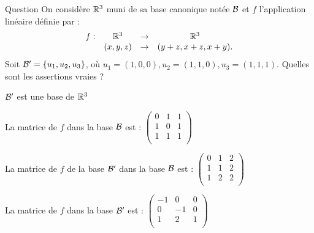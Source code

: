\begin{multi}[multiple,feedback=
{La matrice de \(f\)  d'une base \( {\cal {B}}=(u_j)\) dans une autre base \( {\cal {B}}'=(v_i)\) est la matrice  dont la \(j\)ième colonne est constituée des coordonnées de  \(f(u_j)\) dans la base \( {\cal {B}}'\). On déduit que :
\vskip0mm
La matrice de \(f\) dans la base canonique est : \(
\left(\begin{array}{rcc}
0&1&1\\
1&0&1\\ 
1&1&0\\
\end{array}\right)\).
\vskip0mm
La matrice de \(f\) de la base \( {\cal {B'}}\) dans la base \( {\cal {B}}\) est : \(
\left(\begin{array}{rcc}
0&1&2\\
1&1&2\\ 
1&2&2\\
\end{array}\right).\)
\vskip0mm
La matrice de \(f\) dans la base \( {\cal {B'}}\) est : \(
\left(\begin{array}{rcc}
-1&0&0\\
0&-1&0\\ 
1&2&2\\
\end{array}\right)\).
}]{Question}
On considère \(\mathbb{R}^3\) muni de sa base canonique notée \({\cal {B}}\) et 
\(f\) l'application linéaire définie  par : 
\[\begin{array}{rccc}f:&\mathbb{R}^3 &\to& \mathbb{R}^3\\
& (x,y,z)&\to &(y+z,x+z,x+y).  \end{array}\]
Soit \({\cal {B'}} = \{u_1,u_2,u_3\}\), où
\( u_1=(1,0,0), u_2=(1,1,0), u_3=(1,1,1)\). Quelles sont les assertions vraies ?

    \item* \({\cal {B'}}\) est une base de  \(\mathbb{R}^3\)
    \item La matrice de \(f\) dans la base \( {\cal {B}}\) est : \(
\left(\begin{array}{rcc}
0&1&1\\
1&0&1\\
1&1&1\\
\end{array}\right)\)
    \item* La matrice de \(f\) de la base \( {\cal {B'}}\) dans la base \( {\cal {B}}\) est : \(
\left(\begin{array}{rcc}
0&1&2\\
1&1&2\\
1&2&2\\
\end{array}\right)\)
    \item La matrice de \(f\) dans la base \( {\cal {B'}}\) est : \(
\left(\begin{array}{rcc}
-1&0&0\\
0&-1&0\\
1&2&1\\
\end{array}\right)\)
\end{multi}


